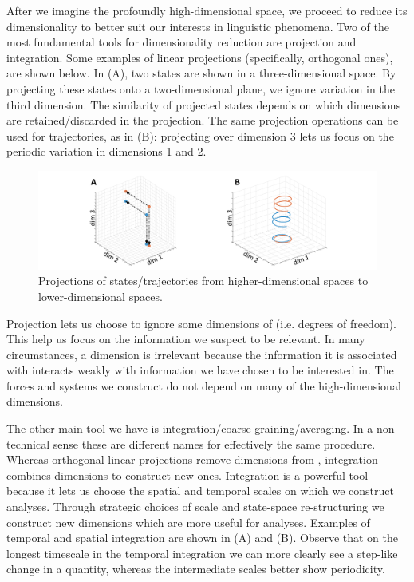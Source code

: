   After we imagine the profoundly high-dimensional space, we proceed to reduce its dimensionality to better suit our interests in linguistic phenomena. Two of the most fundamental tools for dimensionality reduction are projection and integration. Some examples of linear projections (specifically, orthogonal ones), are shown below. In {}(A), two states are shown in a three-dimensional space. By projecting these states onto a two-dimensional plane, we ignore variation in the third dimension. The similarity of projected states depends on which dimensions are retained/discarded in the projection. The same projection operations can be used for trajectories, as in {}(B): projecting over dimension 3 lets us focus on the periodic variation in dimensions 1 and 2.

  
\begin{figure}
\includegraphics[width=\textwidth]{figures/Tilsen-img170.png}
\caption{Projections of states/trajectories from higher-dimensional spaces to lower-dimensional spaces.}
\label{fig:8:4}
\end{figure}
 

  Projection lets us choose to ignore some dimensions of  (i.e. degrees of freedom). This help us focus on the information we suspect to be relevant. In many circumstances, a dimension is irrelevant because the information it is associated with interacts weakly with information we have chosen to be interested in. The forces and systems we construct do not depend on many of the high-dimensional  dimensions. 

  The other main tool we have is integration/coarse-graining/averaging. In a non-technical sense these are different names for effectively the same procedure. Whereas orthogonal linear projections remove dimensions from , integration combines dimensions to construct new ones. Integration is a powerful tool because it lets us choose the spatial and temporal scales on which we construct analyses. Through strategic choices of scale and state-space re-structuring we construct new dimensions which are more useful for analyses. Examples of temporal and spatial integration are shown in {}(A) and (B). Observe that on the longest timescale in the temporal integration we can more clearly see a step-like change in a quantity, whereas the intermediate scales better show periodicity.

